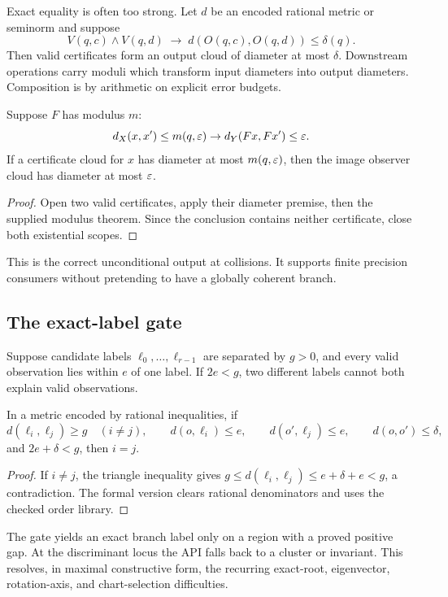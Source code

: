 Exact equality is often too strong.  Let \(d\) be an encoded rational metric
or seminorm and suppose
\[
 V(q,c)\wedge V(q,d)\;\longrightarrow\;
 d(O(q,c),O(q,d))\le\delta(q).
\]
Then valid certificates form an output cloud of diameter at most \(\delta\).
Downstream operations carry moduli which transform input diameters into output
diameters.  Composition is by arithmetic on explicit error budgets.

\begin{theorem}
Suppose \(F\) has modulus \(m\):
\[
  d_X(x,x')\le m(q,\varepsilon)\to d_Y(Fx,Fx')\le\varepsilon.
\]
If a certificate cloud for \(x\) has diameter at most \(m(q,\varepsilon)\), then the
image observer cloud has diameter at most \(\varepsilon\).
\end{theorem}

\begin{proof}
Open two valid certificates, apply their diameter premise, then the supplied
modulus theorem.  Since the conclusion contains neither certificate, close
both existential scopes.
\end{proof}

This is the correct unconditional output at collisions.  It supports finite
precision consumers without pretending to have a globally coherent branch.

\subsection{The exact-label gate}

Suppose candidate labels \(\ell_0,\ldots,\ell_{r-1}\) are separated by
\(g>0\), and every valid observation lies within \(e\) of one label.  If
\(2e<g\), two different labels cannot both explain valid observations.

\begin{lemma}
In a metric encoded by rational inequalities, if
\[
 d(\ell_i,\ell_j)\ge g\quad(i\ne j),
 \qquad d(o,\ell_i)\le e,
 \qquad d(o',\ell_j)\le e,
 \qquad d(o,o')\le\delta,
\]
and \(2e+\delta<g\), then \(i=j\).
\end{lemma}

\begin{proof}
If \(i\ne j\), the triangle inequality gives
\(g\le d(\ell_i,\ell_j)\le e+\delta+e<g\), a contradiction.  The formal
version clears rational denominators and uses the checked order library.
\end{proof}

The gate yields an exact branch label only on a region with a proved positive
gap.  At the discriminant locus the API falls back to a cluster or invariant.
This resolves, in maximal constructive form, the recurring exact-root,
eigenvector, rotation-axis, and chart-selection difficulties.

